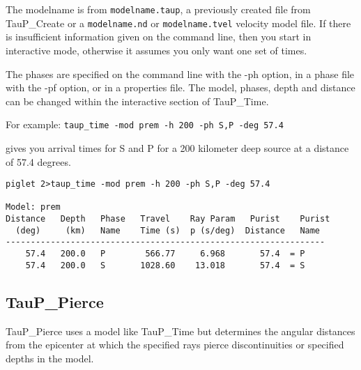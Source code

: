 The modelname is from \texttt{modelname.taup}, a previously created file 
from TauP\_Create or a \texttt{modelname.nd} or \texttt{modelname.tvel} velocity model file. 
If there is insufficient information given on the command line, then you start
in interactive mode, otherwise it assumes you only want one set of times.

The phases are specified on the command line with the -ph option,
in a phase file with the -pf option, or in a properties file.
The model, phases, depth and distance can be changed within the interactive
section of TauP\_Time.

For example: \texttt{taup\_time -mod prem -h 200 -ph S,P -deg 57.4}

gives you arrival times for S and P for a 200 kilometer
deep source at a distance of 57.4 degrees.
\begin{verbatim}
piglet 2>taup_time -mod prem -h 200 -ph S,P -deg 57.4

Model: prem
Distance   Depth   Phase   Travel    Ray Param   Purist    Purist
  (deg)     (km)   Name    Time (s)  p (s/deg)  Distance   Name
----------------------------------------------------------------
    57.4   200.0   P        566.77     6.968       57.4  = P    
    57.4   200.0   S       1028.60    13.018       57.4  = S
\end{verbatim}

\subsection{TauP\_Pierce}

TauP\_Pierce uses a model like TauP\_Time but
determines the
angular distances from the epicenter at which the specified rays pierce 
discontinuities or specified depths in the model.

